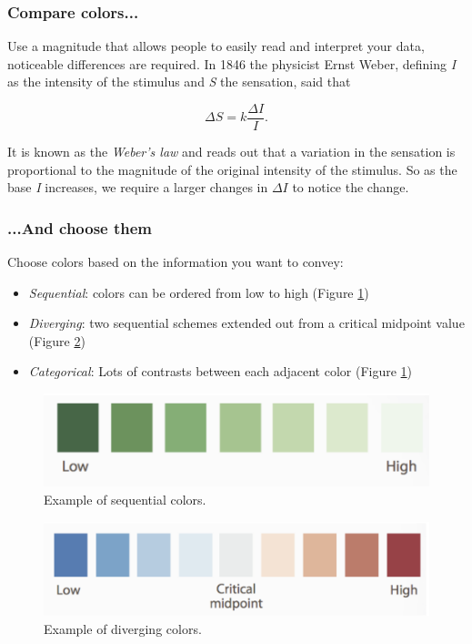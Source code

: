 \subsubsection*{Compare colors...}
Use a magnitude that allows people to easily read and interpret your data, noticeable differences are required. In 1846 the physicist Ernst Weber, defining \emph{I} as the intensity of the stimulus and \emph{S} the sensation, said that

$$\Delta S = k \frac{\Delta I}{I}.$$

It is known as the \emph{Weber's law} and reads out that a variation in the sensation is proportional to the magnitude of the original intensity of the stimulus. So as the base \emph{I} increases, we require a larger changes in  $\Delta I$ to notice the change. 

\subsubsection*{...And choose them}

Choose colors based on the information you want to convey:

\begin{itemize}
\item \emph{Sequential}: colors can be ordered from low to high (Figure \ref{pic:sequential})
\item \emph{Diverging}: two sequential schemes extended out from a critical midpoint value (Figure \ref{pic:diverging})
\item \emph{Categorical}: Lots of contrasts between each adjacent color (Figure \ref{pic:sequential})
\end{itemize}

\begin{figure}[H]%
 \centering
 \includegraphics[width=13cm]{./img/06/sequential}
 \caption{\label{pic:sequential} Example of sequential colors.}
\end{figure}


\begin{figure}[H]%
 \centering
 \includegraphics[width=13cm]{./img/06/diverging}
 \caption{\label{pic:diverging} Example of diverging colors.}
\end{figure}

